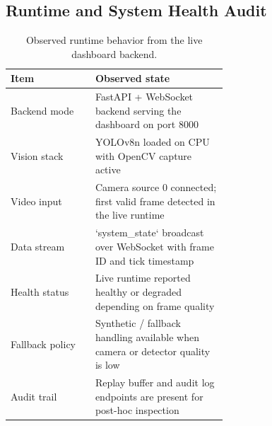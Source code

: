 \documentclass[conference]{IEEEtran}
\begin{document}
\subsection{Runtime and System Health Audit}
\begin{table}[t]
\centering
\caption{Observed runtime behavior from the live dashboard backend.}
\label{tab:runtime-audit}
\begin{tabular}{l p{0.61\linewidth}}
\toprule
\textbf{Item} & \textbf{Observed state} \\
\midrule
Backend mode & FastAPI + WebSocket backend serving the dashboard on port 8000 \\
Vision stack & YOLOv8n loaded on CPU with OpenCV capture active \\
Video input & Camera source 0 connected; first valid frame detected in the live runtime \\
Data stream & `system_state` broadcast over WebSocket with frame ID and tick timestamp \\
Health status & Live runtime reported healthy or degraded depending on frame quality \\
Fallback policy & Synthetic / fallback handling available when camera or detector quality is low \\
Audit trail & Replay buffer and audit log endpoints are present for post-hoc inspection \\
\bottomrule
\end{tabular}
\end{table}
\end{document}
